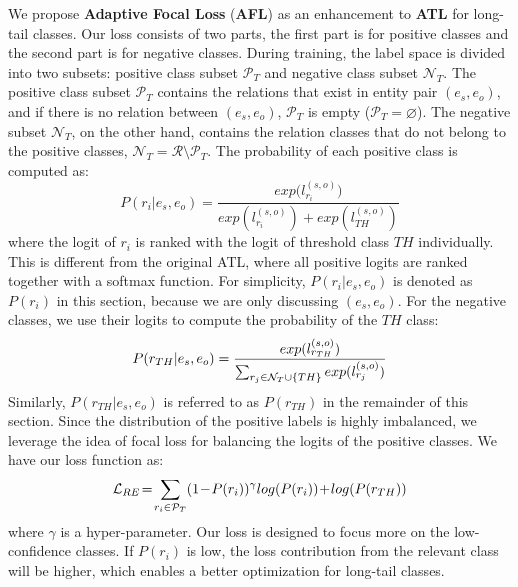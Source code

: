 \documentclass[11pt]{article}
\begin{document}
We propose \textbf{Adaptive Focal Loss} (\textbf{AFL}) as an enhancement to \textbf{ATL} for long-tail classes. Our loss consists of two parts, the first part is for positive classes and the second part is for negative classes. During training, the label space is divided into two subsets: positive class subset $\mathcal{P}_{T}$ and negative class subset $\mathcal{N}_{T}$. The positive class subset $\mathcal{P}_{T}$ contains the relations that exist in entity pair $(e_s, e_o)$, and if there is no relation between $(e_s, e_o)$, $\mathcal{P}_{T}$ is empty ($\mathcal{P}_{T}  = \varnothing$). The negative subset $\mathcal{N}_{T}$, on the other hand, contains the relation classes that do not belong to the positive classes, $\mathcal{N}_{T} = \mathcal{R} \setminus \mathcal{P}_{T}$. The probability of each positive class is computed as:
\begin{equation}
    P(r_{i}|e_{s}, e_{o}) = \frac{exp({{l}^{(s,o)}_{r_i})}}{ exp({l}^{(s,o)}_{r_i}) + 
    exp({l}^{(s,o)}_{TH})}
\end{equation}
where the logit of $r_{i}$ is ranked with the logit of threshold class $TH$ individually. This is different from the original ATL, where all positive logits are ranked together with a softmax function. For simplicity, $P(r_{i}|e_{s}, e_{o})$ is denoted as $P(r_{i})$ in this section, because we are only discussing $(e_s, e_o)$. For the negative classes, we use their logits to compute the probability of the $TH$ class:
\begin{equation}\small
    P(r_{TH}|e_{s}, e_{o}) = \frac{exp({l}^{(s,o)}_{r_{TH}})}{\sum_{{r_j} \in \mathcal{N}_{T} \cup \{TH\}} exp({l}^{(s,o)}_{r_j})} 
\end{equation}
Similarly, $P(r_{TH}|e_{s}, e_{o})$ is referred to as $P(r_{TH})$ in the remainder of this section. Since the distribution of the positive labels is highly imbalanced, we leverage the idea of focal loss \citep{lin2017focal} for balancing the logits of the positive classes. We have our loss function as:
\begin{equation}
\label{eq:re_loss}\small
    \mathcal{L}_{RE}\!=\!\sum_{r_i \in \mathcal{P}_{T}} (1\!-\!P(r_{i}))^{\gamma}log(P(r_{i}))\!+\!log(P(r_{TH}))
\end{equation}
where $\gamma$ is a hyper-parameter. Our loss is designed to focus more on the low-confidence classes. If $P(r_{i})$ is low, the loss contribution from the relevant class will be higher, which enables a better optimization for long-tail classes.  
\end{document}
